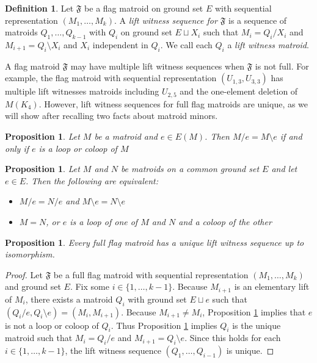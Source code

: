 \documentclass[12pt]{article}
\newtheorem{prop}[thm]{Proposition}
\theoremstyle{definition}
\newtheorem{defn}[thm]{Definition}
\begin{document}
\begin{defn}
    Let $\mathfrak{F}$ be a flag matroid on ground set $E$ with sequential representation $(M_1,\dots,M_k)$.
    A \emph{lift witness sequence for $\mathfrak{F}$} is a sequence of matroids $Q_1,\dots,Q_{k-1}$
    with $Q_i$ on ground set $E \sqcup X_i$ such that $M_i = Q_i / X_i$ and $M_{i+1} = Q_i \setminus X_i$
    and $X_i$ independent in $Q_i$.
    We call each $Q_i$ a \emph{lift witness matroid}.
\end{defn} 

A flag matroid $\mathfrak{F}$ may have multiple lift witness sequences
when $\mathfrak{F}$ is not full.
For example, the flag matroid with sequential representation $(U_{1,3}, U_{3,3})$ has multiple lift witnesses
matroids including $U_{2,5}$ and the one-element deletion of $M(K_4)$.
However, lift witness sequences for full flag matroids are unique,
as we will show after recalling two facts about matroid minors.

\begin{prop}{\cite[Corollary 3.1.24]{oxley}}\label{prop: lift pair equal iff (co)loop}
    Let $M$ be a matroid and $e \in E(M)$. Then $M/e = M\setminus e$ if and only if $e$ is a loop or coloop of $M$
\end{prop}

\begin{prop}{\cite[Proposition 3.1.27]{oxley}}\label{prop: lift witness matroid is unique}
    Let $M$ and $N$ be matroids on a common ground set $E$ and let $e \in E$. Then the following are equivalent:
    \begin{itemize}
        \item $M/e = N/e$ and $M\setminus e = N\setminus e$ 
        \item $M = N$, or $e$ is a loop of one of $M$ and $N$ and a coloop of the other
    \end{itemize}
\end{prop}

\begin{prop}\label{prop: full flag matroids have unique lift witness sequence}
    Every full flag matroid has a unique lift witness sequence up to isomorphism. 
\end{prop}
\begin{proof}
    Let $\mathfrak{F}$ be a full flag matroid with sequential representation $(M_1, \dots, M_k)$ and ground set $E$.
    Fix some $i \in \{1,\dots,k-1\}$.
    Because $M_{i+1}$ is an elementary lift of $M_i$,
    there exists a matroid $Q_i$ with ground set $E\sqcup e$ such that
    $(Q_i/e, Q_i\setminus e) = (M_i,M_{i+1})$.
    Because $M_{i+1} \neq M_i$, Proposition \ref{prop: lift pair equal iff (co)loop} implies that
    $e$ is not a loop or coloop of $Q_i$.
    Thus Proposition \ref{prop: lift witness matroid is unique} implies $Q_i$ is the unique matroid such that $M_i = Q_i/e$ and $M_{i+1} = Q_i\setminus e$.
    Since this holds for each $i \in \{1,\dots,k-1\}$, the lift witness sequence $(Q_1, \dots, Q_{i-1})$ is unique. 
\end{proof}
\end{document}
